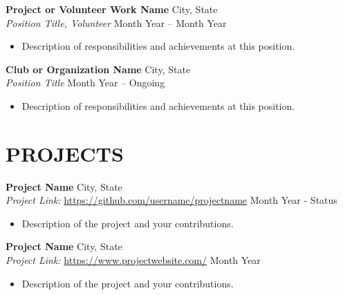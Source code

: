\noindent
\textbf{Project or Volunteer Work Name} \hfill City, State\\ %
\textit{Position Title, Volunteer} \hfill Month Year – Month Year %
\begin{itemize}
    \item Description of responsibilities and achievements at this position. %
\end{itemize}

\textbf{Club or Organization Name} \hfill City, State\\ %
\textit{Position Title} \hfill Month Year – Ongoing %
\begin{itemize}
    \item Description of responsibilities and achievements at this position. %
\end{itemize}

\section*{PROJECTS}
\noindent
\textbf{Project Name} \hfill City, State\\ %
\textit{Project Link:} \url{https://github.com/username/projectname} \hfill Month Year - Status %
\begin{itemize}
    \item Description of the project and your contributions. %
\end{itemize}

\noindent
\textbf{Project Name} \hfill City, State\\ %
\textit{Project Link:} \url{https://www.projectwebsite.com/} \hfill Month Year %
\begin{itemize}
    \item Description of the project and your contributions. %
\end{itemize}